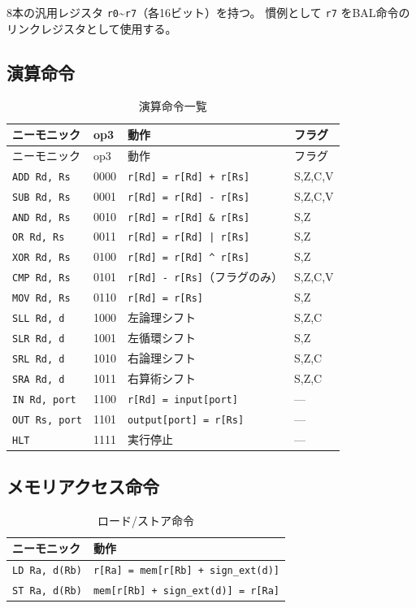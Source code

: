 \documentclass[a4paper,11pt]{ltjsarticle}
\begin{document}
8本の汎用レジスタ \texttt{r0}\textasciitilde\texttt{r7}（各16ビット）を持つ。
慣例として \texttt{r7} をBAL命令のリンクレジスタとして使用する。

\subsection{演算命令}

\begin{longtable}{llp{6cm}l}
\caption{演算命令一覧} \label{tab:alu_ops} \\
\toprule
ニーモニック & op3 & 動作 & フラグ \\
\midrule
\endfirsthead
\toprule
ニーモニック & op3 & 動作 & フラグ \\
\midrule
\endhead
\texttt{ADD Rd, Rs} & 0000 & \texttt{r[Rd] = r[Rd] + r[Rs]} & S,Z,C,V \\
\texttt{SUB Rd, Rs} & 0001 & \texttt{r[Rd] = r[Rd] - r[Rs]} & S,Z,C,V \\
\texttt{AND Rd, Rs} & 0010 & \texttt{r[Rd] = r[Rd] \& r[Rs]} & S,Z \\
\texttt{OR Rd, Rs}  & 0011 & \texttt{r[Rd] = r[Rd] | r[Rs]} & S,Z \\
\texttt{XOR Rd, Rs} & 0100 & \texttt{r[Rd] = r[Rd] \^{} r[Rs]} & S,Z \\
\texttt{CMP Rd, Rs} & 0101 & \texttt{r[Rd] - r[Rs]}（フラグのみ） & S,Z,C,V \\
\texttt{MOV Rd, Rs} & 0110 & \texttt{r[Rd] = r[Rs]} & S,Z \\
\midrule
\texttt{SLL Rd, d}  & 1000 & 左論理シフト & S,Z,C \\
\texttt{SLR Rd, d}  & 1001 & 左循環シフト & S,Z \\
\texttt{SRL Rd, d}  & 1010 & 右論理シフト & S,Z,C \\
\texttt{SRA Rd, d}  & 1011 & 右算術シフト & S,Z,C \\
\midrule
\texttt{IN Rd, port} & 1100 & \texttt{r[Rd] = input[port]} & --- \\
\texttt{OUT Rs, port} & 1101 & \texttt{output[port] = r[Rs]} & --- \\
\texttt{HLT}         & 1111 & 実行停止 & --- \\
\bottomrule
\end{longtable}

\subsection{メモリアクセス命令}

\begin{table}[h]
\centering
\caption{ロード/ストア命令}
\begin{tabular}{lp{8cm}}
\toprule
ニーモニック & 動作 \\
\midrule
\texttt{LD Ra, d(Rb)} & \texttt{r[Ra] = mem[r[Rb] + sign\_ext(d)]} \\
\texttt{ST Ra, d(Rb)} & \texttt{mem[r[Rb] + sign\_ext(d)] = r[Ra]} \\
\bottomrule
\end{tabular}
\end{table}
\end{document}

